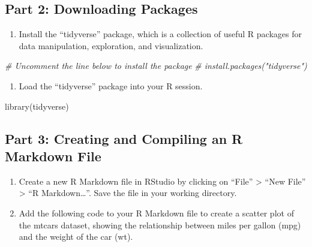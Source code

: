 \documentclass[
]{book}
\newenvironment{Shaded}{\begin{snugshade}}{\end{snugshade}}
\newcommand{\CommentTok}[1]{\textcolor[rgb]{0.56,0.35,0.01}{\textit{#1}}}
\newcommand{\FunctionTok}[1]{\textcolor[rgb]{0.00,0.00,0.00}{#1}}
\newcommand{\NormalTok}[1]{#1}
\providecommand{\tightlist}{%
  \setlength{\itemsep}{0pt}\setlength{\parskip}{0pt}}
\begin{document}
\hypertarget{part-2-downloading-packages}{%
\subsection{Part 2: Downloading Packages}\label{part-2-downloading-packages}}

\begin{enumerate}
\def\labelenumi{\arabic{enumi}.}
\tightlist
\item
  Install the ``tidyverse'' package, which is a collection of useful R packages for data manipulation, exploration, and visualization.
\end{enumerate}

\begin{Shaded}
\begin{Highlighting}[]
\CommentTok{\# Uncomment the line below to install the package}
\CommentTok{\# install.packages("tidyverse")}
\end{Highlighting}
\end{Shaded}

\begin{enumerate}
\def\labelenumi{\arabic{enumi}.}
\setcounter{enumi}{1}
\tightlist
\item
  Load the ``tidyverse'' package into your R session.
\end{enumerate}

\begin{Shaded}
\begin{Highlighting}[]
\FunctionTok{library}\NormalTok{(tidyverse)}
\end{Highlighting}
\end{Shaded}

\hypertarget{part-3-creating-and-compiling-an-r-markdown-file}{%
\subsection{Part 3: Creating and Compiling an R Markdown File}\label{part-3-creating-and-compiling-an-r-markdown-file}}

\begin{enumerate}
\def\labelenumi{\arabic{enumi}.}
\item
  Create a new R Markdown file in RStudio by clicking on ``File'' \textgreater{} ``New File'' \textgreater{} ``R Markdown\ldots{}''. Save the file in your working directory.
\item
  Add the following code to your R Markdown file to create a scatter plot of the mtcars dataset, showing the relationship between miles per gallon (mpg) and the weight of the car (wt).
\end{enumerate}
\end{document}
